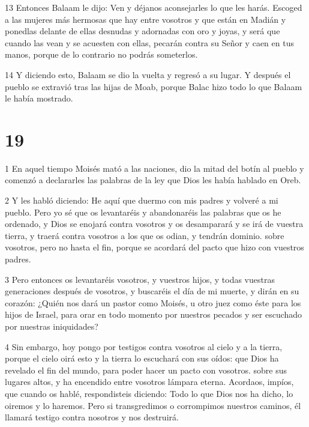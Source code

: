 \par 13 Entonces Balaam le dijo: Ven y déjanos aconsejarles lo que les harás. Escoged a las mujeres más hermosas que hay entre vosotros y que están en Madián y ponedlas delante de ellas desnudas y adornadas con oro y joyas, y será que cuando las vean y se acuesten con ellas, pecarán contra su Señor y caen en tus manos, porque de lo contrario no podrás someterlos.

\par 14 Y diciendo esto, Balaam se dio la vuelta y regresó a su lugar. Y después el pueblo se extravió tras las hijas de Moab, porque Balac hizo todo lo que Balaam le había mostrado.

\chapter{19}

\par 1 En aquel tiempo Moisés mató a las naciones, dio la mitad del botín al pueblo y comenzó a declararles las palabras de la ley que Dios les había hablado en Oreb.

\par 2 Y les habló diciendo: He aquí que duermo con mis padres y volveré a mi pueblo. Pero yo sé que os levantaréis y abandonaréis las palabras que os he ordenado, y Dios se enojará contra vosotros y os desamparará y se irá de vuestra tierra, y traerá contra vosotros a los que os odian, y tendrán dominio. sobre vosotros, pero no hasta el fin, porque se acordará del pacto que hizo con vuestros padres.

\par 3 Pero entonces os levantaréis vosotros, y vuestros hijos, y todas vuestras generaciones después de vosotros, y buscaréis el día de mi muerte, y dirán en su corazón: ¿Quién nos dará un pastor como Moisés, u otro juez como éste para los hijos de Israel, para orar en todo momento por nuestros pecados y ser escuchado por nuestras iniquidades?

\par 4 Sin embargo, hoy pongo por testigos contra vosotros al cielo y a la tierra, porque el cielo oirá esto y la tierra lo escuchará con sus oídos: que Dios ha revelado el fin del mundo, para poder hacer un pacto con vosotros. sobre sus lugares altos, y ha encendido entre vosotros lámpara eterna. Acordaos, impíos, que cuando os hablé, respondisteis diciendo: Todo lo que Dios nos ha dicho, lo oiremos y lo haremos. Pero si transgredimos o corrompimos nuestros caminos, él llamará testigo contra nosotros y nos destruirá.

